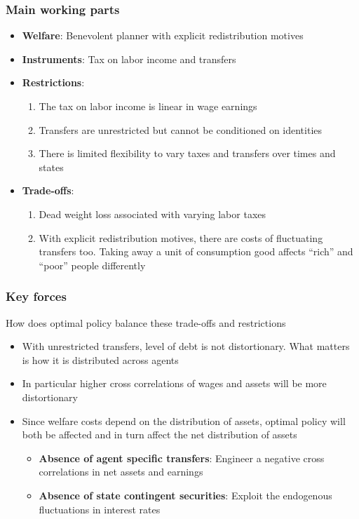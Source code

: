 \documentclass{beamer}
\begin{document}
\begin{frame}
 \frametitle{Main working parts}
\begin{itemize}
 \item \textbf{Welfare}: Benevolent planner with explicit redistribution motives
 \item \textbf{Instruments}: Tax on labor income and transfers
 \item \textbf{Restrictions}: 
 \begin{enumerate}
  \item The tax on labor income is linear in wage earnings
  \item Transfers are unrestricted but cannot be conditioned on identities
  \item There is limited flexibility to vary taxes and transfers over times and states
 \end{enumerate}
\item \textbf{Trade-offs}:  
\begin{enumerate}
\item Dead weight loss associated with varying labor taxes
\item With  explicit redistribution motives, there are costs of fluctuating transfers too. Taking away a unit of consumption good affects ``rich'' and ``poor'' people differently
\end{enumerate}
\end{itemize}
\end{frame}
\begin{frame}
 \frametitle{Key forces}
 How does optimal policy balance these trade-offs and restrictions
 \begin{itemize}
 \item With unrestricted transfers, level of debt is not distortionary. What matters is how it is distributed across agents
 \item In particular higher cross correlations of wages and assets will be more distortionary
 \item Since welfare costs depend on the distribution of assets, optimal policy will  both be affected and in turn affect the net distribution of assets
\begin{itemize}
\item \textbf{Absence of agent specific transfers}: Engineer  a negative cross correlations in net assets and earnings
\item \textbf{Absence of state contingent securities}: Exploit the endogenous fluctuations in interest rates 
\end{itemize}

 \end{itemize}

\end{frame}
\end{document}
